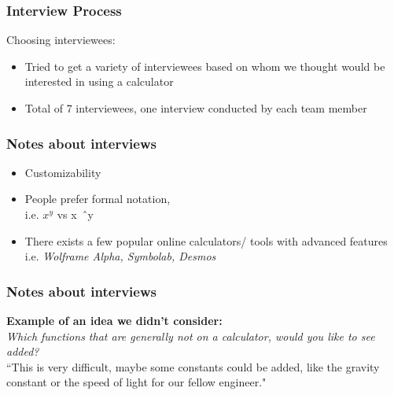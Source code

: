\documentclass{beamer}
\begin{document}
\begin{frame}
    \frametitle{Interview Process}
    Choosing interviewees:
    \begin{itemize}
        \item Tried to get a variety of interviewees based on whom we thought would be interested in using a calculator
        \item Total of 7 interviewees, one interview conducted by each team member
    \end{itemize}
\end{frame}

\begin{frame}
    \frametitle{Notes about interviews}

    \begin{itemize}
        \item Customizability \pause
        \item People prefer formal notation,\\ i.e. $x^y$ vs x\ \^\ y \pause %
        \item There exists a few popular online calculators/ tools with advanced features \\
            i.e. \textit{Wolframe Alpha, Symbolab, Desmos}
    \end{itemize} 
    
\end{frame}

\begin{frame}
    \frametitle{Notes about interviews}

    \textbf{Example of an idea we didn't consider:} \\
    \textit{Which functions that are generally not on a calculator, would you like to see added?} \\
    ``This is very difficult, maybe some constants could be added, 
    like the gravity constant or the speed of light for our fellow engineer."

\end{frame}
\end{document}
